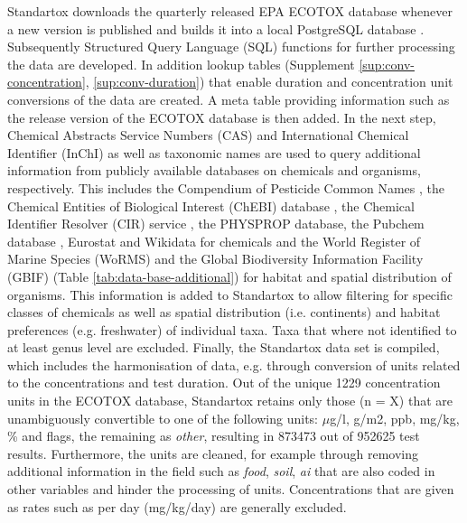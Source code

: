 Standartox downloads the quarterly released EPA ECOTOX database whenever a new version is published and builds it into a local PostgreSQL database \citep{szocs_build_2019}. Subsequently Structured Query Language (SQL) functions for further processing the data are developed. In addition lookup tables (Supplement \ref{sup:conv-concentration}, \ref{sup:conv-duration}) that enable duration and concentration unit conversions of the data are created. A meta table providing information such as the release version of the ECOTOX database is then added. In the next step, Chemical Abstracts Service Numbers (CAS) and International Chemical Identifier (InChI) as well as taxonomic names are used to query additional information from publicly available databases on chemicals and organisms, respectively. This includes the Compendium of Pesticide Common Names \citep{wood_compendium_2019}, the Chemical Entities of Biological Interest (ChEBI) database \citep{hastings_chebi_2016}, the Chemical Identifier Resolver (CIR) service \citep{nationalinstitutesofhealthnih_chemical_2019}, the PHYSPROP database, the Pubchem database \citep{kim_pubchem_2016}, Eurostat \citep{europeancommission_eurostat_2019} and Wikidata \citep{vrandecic_wikidata_2014} for chemicals and the World Register of Marine Species (WoRMS) \citep{wormseditorialboard_world_2018} and the Global Biodiversity Information Facility (GBIF) \citep{_gbif_2019} (Table \ref{tab:data-base-additional}) for habitat and spatial distribution of organisms. This information is added to Standartox to allow filtering for specific classes of chemicals as well as spatial distribution (i.e. continents) and habitat preferences (e.g. freshwater) of individual taxa. Taxa that where not identified to at least genus level are excluded. Finally, the Standartox data set is compiled, which includes the harmonisation of data, e.g. through conversion of units related to the concentrations and test duration. Out of the unique 1229 concentration units in the ECOTOX database, Standartox retains only those (n = X) that are unambiguously convertible to one of the following units: $\mu$g/l, g/m2, ppb, mg/kg, \% and flags, the remaining as \textit{other}, resulting in 873473 out of 952625 test results. Furthermore, the units are cleaned, for example through removing additional information in the field such as \textit{food}, \textit{soil}, \textit{ai} that are also coded in other variables and hinder the processing of units. Concentrations that are given as rates such as per day (mg/kg/day) are generally excluded.
